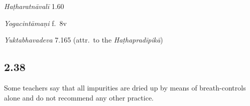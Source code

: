 \begin{ekdosis}
\begin{testimonia}[hp02_037]
\emph{Haṭharatnāvalī} 1.60

\begin{versinnote}
\end{versinnote} 

\emph{Yogacintāmaṇi} f.~8v

\begin{versinnote}
\end{versinnote}

\emph{Yuktabhavadeva} 7.165 (attr.~to the \emph{Haṭhapradīpikā})

\begin{versinnote}
\end{versinnote}
\end{testimonia}


\subsection*{2.38}
\begin{translation}[hp02_038]
Some teachers say that all impurities are dried up by means of breath-controls alone and do not recommend any other practice.
\end{translation}


\end{ekdosis}
